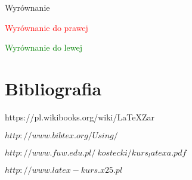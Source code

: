 \documentclass{article}
\begin{document}
Wyrównanie 

\begin{flushright}
\textcolor{red}{Wyrównanie do prawej}
\end{flushright}
\begin{flushleft}
\textcolor{green}{Wyrównanie do lewej}
\end{flushleft}

\medskip

\section{Bibliografia}
\begin{thebibliography}{9}

https://pl.wikibooks.org/wiki/LaTeXZar%
  
$http://www.bibtex.org/Using/$

$http://www.fuw.edu.pl/~kostecki/kurs_latexa.pdf$

$http://www.latex-kurs.x25.pl$
\end{thebibliography}
\end{document}
